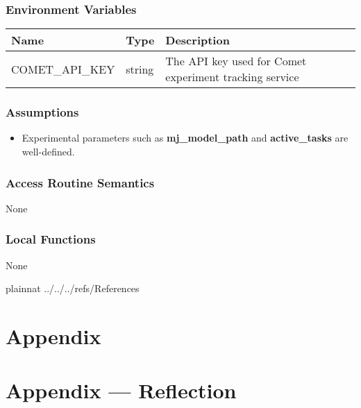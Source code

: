 \documentclass[12pt, titlepage]{article}
\begin{document}
\subsubsection{Environment Variables}
\begin{center}
  \begin{tabular}{p{4cm} p{4cm} p{6cm}}
  \hline
  \textbf{Name} & \textbf{Type} & \textbf{Description} \\
  \hline
  COMET\_API\_KEY & string & The API key used for Comet experiment tracking service \\
  \hline
  \end{tabular}
  \end{center}

\subsubsection{Assumptions}
\begin{itemize}
  \item Experimental parameters such as \textbf{mj\_model\_path} and \textbf{active\_tasks} are well-defined. 
\end{itemize}

\subsubsection{Access Routine Semantics}
None

\subsubsection{Local Functions}
None

\newpage

 {plainnat}
 {../../../refs/References}

\newpage

\section{Appendix} \label{Appendix}



\section*{Appendix --- Reflection}

\end{document}

